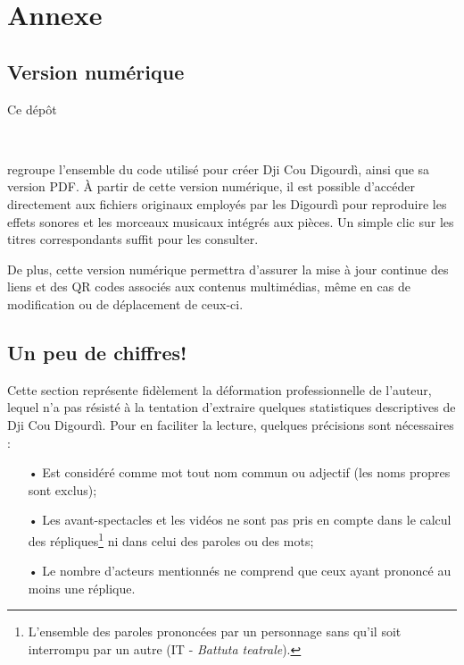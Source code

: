 \chapter*{Annexe}
\section*{Version numérique}\label{vers_num}
Ce dépôt
\begin{center}
\centering
\github\ \hspace*{0.5mm} \href{\detokenize{https://github.com/jbollon/Dji-cou-Digourdi}}{} \hspace*{0.5mm} \github\\
 \vspace*{2mm}
\end{center}
\noindent  regroupe l'ensemble du code utilisé pour créer Dji Cou Digourdì, ainsi que sa version PDF. À partir de cette version numérique, il est possible d'accéder directement aux fichiers originaux employés par les Digourdì pour reproduire les effets sonores et les morceaux musicaux intégrés aux pièces. Un simple clic sur les titres correspondants suffit pour les consulter.

De plus, cette version numérique permettra d’assurer la mise à jour continue des liens et des QR codes associés aux contenus multimédias, même en cas de modification ou de déplacement de ceux-ci.
\newpage
\section*{Un peu de chiffres!}
Cette section représente fidèlement la déformation professionnelle de l'auteur, lequel n'a pas résisté à la tentation d'extraire quelques statistiques descriptives de Dji Cou Digourdì. Pour en faciliter la lecture, quelques précisions sont nécessaires :
\begin{itemize}
\item[•] Est considéré comme mot tout nom commun ou adjectif (les noms propres sont exclus);
\item[•] Les avant-spectacles et les vidéos ne sont pas pris en compte  dans le calcul des répliques\footnote{ L'ensemble des paroles prononcées par un personnage sans qu'il soit interrompu par un autre (IT - \textit{Battuta teatrale}).} ni dans celui des paroles ou des mots;
\item[•] Le nombre d’acteurs mentionnés ne comprend que ceux ayant prononcé au moins une réplique.
\end{itemize}